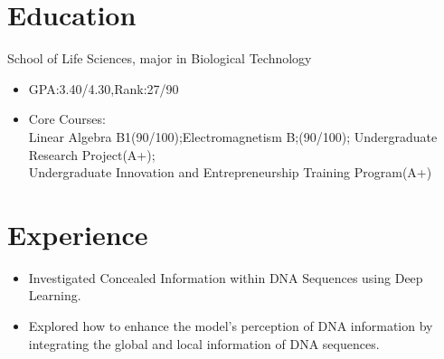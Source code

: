 \documentclass{resume}
\begin{document}



\section{Education}

School of Life Sciences, major in Biological Technology 
\begin{itemize}
  \item GPA:3.40/4.30,Rank:27/90
  \item Core Courses: \\Linear Algebra B1(90/100);Electromagnetism B;(90/100); Undergraduate 
  Research Project(A+);\\Undergraduate Innovation and Entrepreneurship Training Program(A+)
\end{itemize}


\section{Experience}

    \begin{itemize}
      \item Investigated Concealed Information within DNA Sequences using Deep Learning.
      \item Explored how to enhance the model’s perception of DNA information by integrating the global and local information of DNA sequences.
    \end{itemize}
\end{document}
